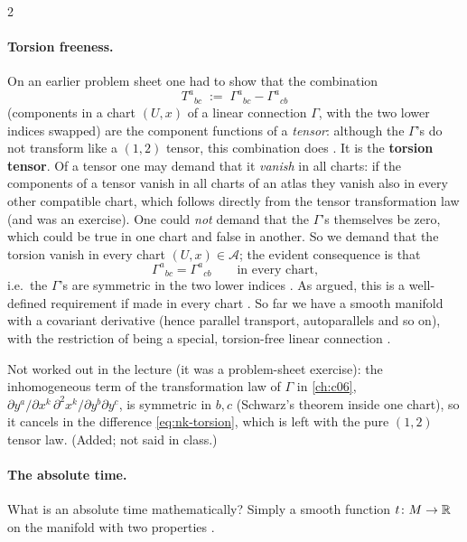 \begin{paracol}{2}
\paragraph{Torsion freeness.} On an earlier problem sheet one had to show that the combination
\begin{equation}\label{eq:nk-torsion}
  T^a{}_{bc}\;:=\;\Gamma^a{}_{bc}-\Gamma^a{}_{cb}
\end{equation}
(components in a chart $(U,x)$ of a linear connection $\Gamma$, with the two lower indices swapped) are the component functions of a \emph{tensor}:
although the $\Gamma$'s do not transform like a $(1,2)$ tensor, this combination does . It is the \textbf{torsion tensor}. Of a tensor one
may demand that it \emph{vanish} in all charts: if the components of a tensor vanish in all charts of an atlas they vanish also in every other compatible
chart, which follows directly from the tensor transformation law (and was an exercise). One could \emph{not} demand that the $\Gamma$'s
themselves be zero, which could be true in one chart and false in another. So we demand that the torsion vanish in every chart $(U,x)\in\mathcal A$; the evident consequence is that
\begin{equation}\label{eq:nk-sym}
  \Gamma^a{}_{bc}=\Gamma^a{}_{cb}\qquad\text{in every chart,}
\end{equation}
i.e.\ the $\Gamma$'s are symmetric in the two lower indices . As argued, this is a well-defined requirement if made in every chart
. So far we have a smooth manifold with a covariant derivative (hence parallel transport, autoparallels and so on), with the restriction of being a special, torsion-free linear connection
.
\begin{coursenote}
Not worked out in the lecture (it was a problem-sheet exercise): the inhomogeneous term of the transformation law of $\Gamma$ in \cref{ch:c06},
$\partial y^a/\partial x^k\,\partial^2x^k/\partial y^b\partial y^c$, is symmetric in $b,c$ (Schwarz's theorem inside one chart),
so it cancels in the difference \eqref{eq:nk-torsion}, which is left with the pure $(1,2)$ tensor law. (Added; not said in class.)
\end{coursenote}

\paragraph{The absolute time.} What is an absolute time mathematically? Simply a smooth function $t\colon M\to\mathbb{R}$ on the manifold with two properties
.


\end{paracol}
